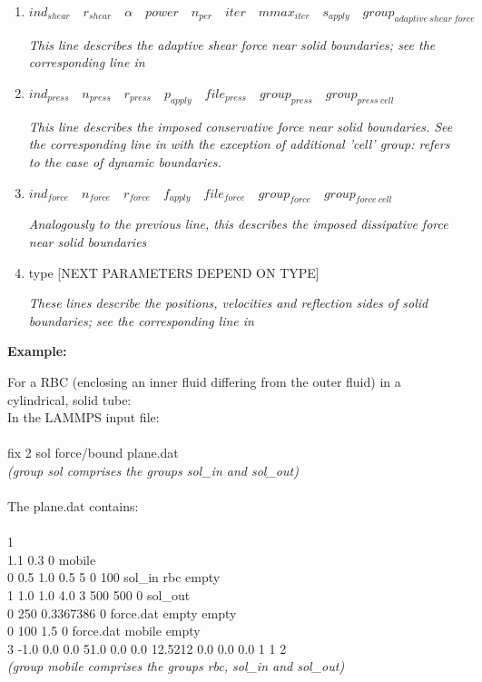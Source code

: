 \documentclass[a4paper,10pt]{scrreprt}
\begin{document}
\begin{enumerate}
\item $  ind_{shear} \quad   r_{shear} \quad   \alpha \quad   power \quad   n_{per} \quad   iter \quad   mmax_{iter} \quad   s_{apply} \quad   group_{adaptive\ shear\ force}$

	{\em This line describes the adaptive shear force near solid boundaries; see the corresponding line in }

\item $  ind_{press} \quad n_{press} \quad r_{press} \quad p_{apply} \quad file_{press} \quad group_{press} \quad group_{press\ cell}$

	{\em This line describes the imposed conservative force near solid boundaries. See the corresponding line in  with the exception of additional 'cell' group: refers to the case of \textit{dynamic} boundaries.}

\item $  ind_{force} \quad n_{force} \quad r_{force} \quad f_{apply} \quad file_{force} \quad group_{force} \quad group_{force\ cell}$

	{\em Analogously to the previous line, this describes the imposed dissipative force near solid boundaries}

\item {type} [NEXT PARAMETERS DEPEND ON TYPE]

	{\em These lines describe the positions, velocities and reflection sides of solid boundaries; see the corresponding line in }

\end{enumerate}

\textbf{Example:}

For a RBC (enclosing an inner fluid differing from the outer fluid) in a cylindrical, solid tube:\\
In the LAMMPS input file:\\ \\
fix	2 sol force/bound plane.dat\\
\textit{(group sol comprises the groups sol\_in and sol\_out)}\\ \\
The plane.dat contains:\\ \\
1\\
1.1 0.3 0 mobile\\
0 0.5 1.0 0.5 5 0 100 sol\_in rbc empty\\
1 1.0 1.0 4.0 3 500 500 0 sol\_out\\
0 250 0.3367386 0 force.dat empty empty\\
0 100 1.5 0 force.dat mobile empty\\
3 -1.0 0.0 0.0 51.0 0.0 0.0 12.5212 0.0 0.0 0.0 1 1 2\\
\textit{(group mobile comprises the groups rbc, sol\_in and sol\_out)}\\
\end{document}
